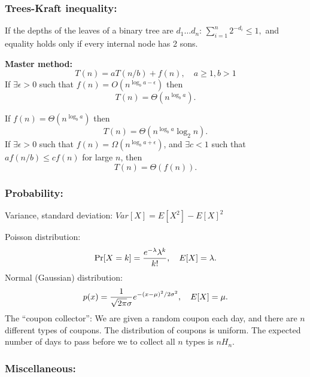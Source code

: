\documentclass[12pt]{extarticle}
\begin{document}
\begin{multicols*}{2}
			\subsubsection*{Trees-Kraft inequality:}
			If the depths of the leaves of a binary tree are $d_1 \ldots d_n$:
			$
			\sum_{i=1}^n 2^{- d_i} \leq 1,
			$
			and equality holds only if every internal node has 2 sons.

			\par\vskip 3pt
			\textbf{Master method:}
			$$T(n) = aT(n/b) + f(n), \quad a\geq 1, b > 1$$
			If $\exists \epsilon > 0$ such that $f(n) = O(n^{\log_b a - \epsilon})$ then
			$$T(n) = \Theta(n^{\log_b a}).$$
			\par
			If $f(n) = \Theta(n^{\log_b a})$ then
			$$T(n) = \Theta(n^{\log_b a} \log_2 n).$$
			If $\exists \epsilon > 0$ such that $f(n) = \Omega(n^{\log_b a + \epsilon})$,
			and $\exists c < 1$ such that $a f(n/b) \leq cf(n)$ for large $n$,
			then
			$$T(n) = \Theta(f(n)).$$
			\subsubsection*{Probability:}
			Variance, standard deviation:
			$Var[X] = E[X^2] - E[X]^2$
			\par\vskip 5pt
			Poisson distribution:
			$$
			\Pr[X = k] = {e^{-\lambda} \lambda^k \over k!}, \quad  E[X] = \lambda.
			$$
			Normal (Gaussian) distribution:
			$$
			p(x) = {1 \over \sqrt{2 \pi} \sigma} e^{-(x-\mu)^2/2\sigma^2}, \quad E[X] = \mu.
			$$
			The ``coupon collector'':
			We are given a random coupon each day,
			and there are $n$ different types of coupons.
			The distribution of coupons is uniform.
			The expected number of days to pass before we to collect all $n$ types is $n H_n.$
			\subsubsection*{Miscellaneous:}
			

\end{multicols*}
\end{document}
